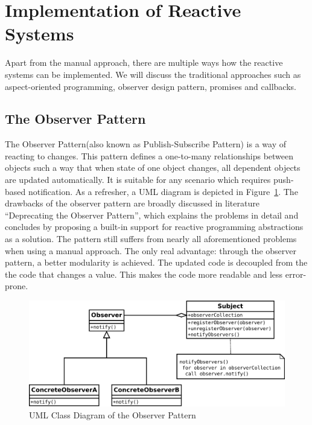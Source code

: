 \section {Implementation of Reactive Systems}
Apart from the manual approach, there are multiple ways how the reactive systems can be implemented. We will discuss the traditional approaches such as aspect-oriented programming, observer design pattern, promises and callbacks. 
	
\subsection{The Observer Pattern}
The Observer Pattern(also known as Publish-Subscribe Pattern)\cite{understandingObserverPattern} is a way of reacting to changes. 
This pattern defines a one-to-many relationships between objects such a way that when state of one object changes, all dependent objects are updated automatically. 
It is suitable for any scenario which requires push-based notification\cite{understandingObserverPattern}. 
As a refresher, a UML diagram is depicted in Figure~\ref{fig:observer-uml}. The drawbacks of the observer pattern are broadly discussed in literature  ``Deprecating the Observer Pattern'', which explains the problems in detail and concludes by proposing a built-in support for reactive programming abstractions as a solution\cite{deprecatingTheObserverPattern}. 
The pattern still suffers from nearly all aforementioned problems when using a manual approach. 
The only real advantage: through the observer pattern, a better modularity is achieved. 
The updated code is decoupled from the the code that changes a value. 
This makes the code more readable and less error-prone. 

\begin{figure}[!h]
	\centering
	\includegraphics[scale=0.5,trim=0 0 0 0]{images/observer-uml.png}
	\caption{UML Class Diagram of the Observer Pattern}
	\label{fig:observer-uml}
\end{figure}

